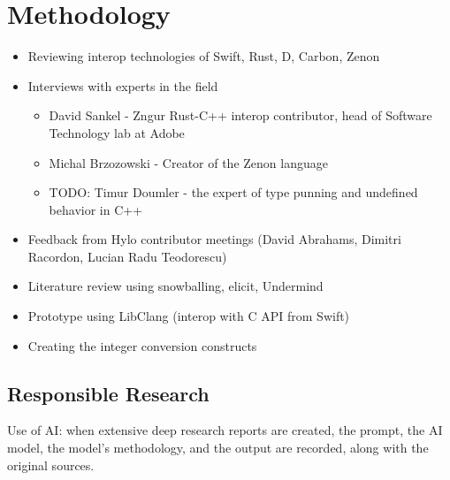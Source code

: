 \section{Methodology}
\begin{itemize}
    \item Reviewing interop technologies of Swift, Rust, D, Carbon, Zenon
    \item Interviews with experts in the field
    \begin{itemize}
        \item David Sankel - Zngur Rust-C++ interop contributor, head of Software Technology lab at Adobe
        \item Michal Brzozowski - Creator of the Zenon language
        \item TODO: Timur Doumler - the expert of type punning and undefined behavior in C++
    \end{itemize}
    \item Feedback from Hylo contributor meetings (David Abrahams, Dimitri Racordon, Lucian Radu Teodorescu)
    \item Literature review using snowballing, elicit, Undermind
    \item Prototype using LibClang (interop with C API from Swift)
    \item Creating the integer conversion constructs
\end{itemize}

\subsection{Responsible Research}
Use of AI: when extensive deep research reports are created, the prompt, the AI model, the model's methodology, and the output are recorded, along with the original sources.